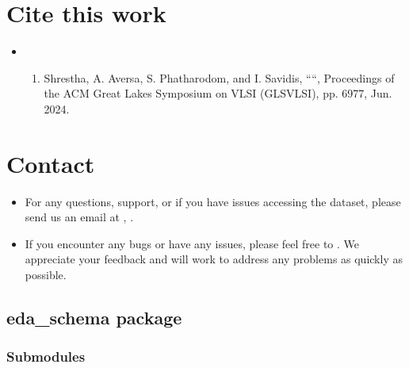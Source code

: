 \documentclass[letterpaper,10pt,english]{sphinxmanual}
\begin{document}
\chapter{Cite this work}
\label{\detokenize{index:cite-this-work}}\begin{itemize}
\item {} \begin{enumerate}
%
\setcounter{enumi}{15}
\item {} 
\sphinxAtStartPar
Shrestha, A. Aversa, S. Phatharodom, and I. Savidis, ““, Proceedings of the ACM Great Lakes Symposium on VLSI (GLSVLSI), pp. 69\textendash{}77, Jun. 2024.

\end{enumerate}

\end{itemize}


\chapter{Contact}
\label{\detokenize{index:contact}}\begin{itemize}
\item {} 
\sphinxAtStartPar
For any questions, support, or if you have issues accessing the dataset, please send us an email at , .

\item {} 
\sphinxAtStartPar
If you encounter any bugs or have any issues, please feel free to . We appreciate your feedback and will work to address any problems as quickly as possible.

\end{itemize}

\sphinxstepscope


\section{eda\_schema package}
\label{\detokenize{eda_schema:eda-schema-package}}\label{\detokenize{eda_schema::doc}}

\subsection{Submodules}
\label{\detokenize{eda_schema:submodules}}
\end{document}

